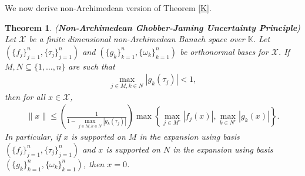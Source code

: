 \documentclass{amsart}
\newtheorem{theorem}{Theorem}[section]
\begin{document}
We now derive non-Archimedean version of Theorem \ref{K}.
\begin{theorem}\label{NGJ}
	(\textbf{Non-Archimedean  Ghobber-Jaming  Uncertainty Principle})
	Let $\mathcal{X}$  be a finite dimensional non-Archimedean Banach  space over $\mathbb{K}$.	Let $(\{f_j\}_{j=1}^n, \{\tau_j\}_{j=1}^n)$	and $(\{g_k\}_{k=1}^n, \{\omega_k\}_{k=1}^n)$ be orthonormal bases  for $\mathcal{X}$.  If $M,N\subseteq \{1, \dots, n\}$ are such that 
	\begin{align*}
		\displaystyle \max_{j \in M, k \in N}|g_k(\tau_j)|<1,
	\end{align*}
	then for all $x \in \mathcal{X}$, 	
	\begin{align}\label{NGH}
			\|x\|\leq  \left(\frac{1}{1-\displaystyle \max_{j \in M, k \in N}|g_k(\tau_j)|}\right)\max\left\{\displaystyle \max_{j \in M^c}|f_j(x) |, \displaystyle \max_{k \in N^c}|g_k(x)|\right\}.
	\end{align}
	In particular, if $x$ is supported on $M$ in the expansion using basis $(\{f_j\}_{j=1}^n, \{\tau_j\}_{j=1}^n)$	 and $x$ is supported on $N$ in the expansion using basis $(\{g_k\}_{k=1}^n, \{\omega_k\}_{k=1}^n)$, then $x=0$. 
\end{theorem}
\end{document}

